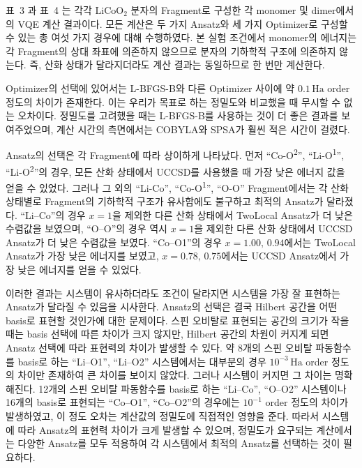 \documentclass[pdflatex,sn-mathphys-num]{sn-jnl}%
\theoremstyle{thmstyleone}%
\theoremstyle{thmstyletwo}%
\theoremstyle{thmstylethree}%
\begin{document}
표~3 과 표~4 는 각각 \(\mathrm{LiCoO_2}\) 분자의 Fragment로 구성한 각 monomer 및 dimer에서의 VQE 계산 결과이다. 모든 계산은 두 가지 Ansatz와 세 가지 Optimizer로 구성할 수 있는 총 여섯 가지 경우에 대해 수행하였다. 본 실험 조건에서 monomer의 에너지는 각 Fragment의 상대 좌표에 의존하지 않으므로 분자의 기하학적 구조에 의존하지 않는다. 즉, 산화 상태가 달라지더라도 계산 결과는 동일하므로 한 번만 계산한다. 

Optimizer의 선택에 있어서는 L-BFGS-B와 다른 Optimizer 사이에 약 \(0.1\,\mathrm{Ha}\) order 정도의 차이가 존재한다. 이는 우리가 목표로 하는 정밀도와 비교했을 때 무시할 수 없는 오차이다. 정밀도를 고려했을 때는 L-BFGS-B를 사용하는 것이 더 좋은 결과를 보여주었으며, 계산 시간의 측면에서는 COBYLA와 SPSA가 훨씬 적은 시간이 걸렸다. 

Ansatz의 선택은 각 Fragment에 따라 상이하게 나타났다. 먼저 “Co-O\textsuperscript{2}”, “Li-O\textsuperscript{1}”, “Li-O\textsuperscript{2}”의 경우, 모든 산화 상태에서 UCCSD를 사용했을 때 가장 낮은 에너지 값을 얻을 수 있었다. 그러나 그 외의 “Li-Co”, “Co-O\textsuperscript{1}”, “O-O” Fragment에서는 각 산화 상태별로 Fragment의 기하학적 구조가 유사함에도 불구하고 최적의 Ansatz가 달라졌다. “Li--Co”의 경우 \(x=1\)을 제외한 다른 산화 상태에서 TwoLocal Ansatz가 더 낮은 수렴값을 보였으며, “O--O”의 경우 역시 \(x=1\)을 제외한 다른 산화 상태에서 UCCSD Ansatz가 더 낮은 수렴값을 보였다. “Co--O1”의 경우 \(x=1.00,\,0.94\)에서는 TwoLocal Ansatz가 가장 낮은 에너지를 보였고, \(x=0.78,\,0.75\)에서는 UCCSD Ansatz에서 가장 낮은 에너지를 얻을 수 있었다.

이러한 결과는 시스템이 유사하더라도 조건이 달라지면 시스템을 가장 잘 표현하는 Ansatz가 달라질 수 있음을 시사한다. Ansatz의 선택은 결국 Hilbert 공간을 어떤 basis로 표현할 것인가에 대한 문제이다. 스핀 오비탈로 표현되는 공간의 크기가 작을 때는 basis 선택에 따른 차이가 크지 않지만, Hilbert 공간의 차원이 커지게 되면 Ansatz 선택에 따라 표현력의 차이가 발생할 수 있다. 약 8개의 스핀 오비탈 파동함수를 basis로 하는 “Li--O1”, “Li--O2” 시스템에서는 대부분의 경우 \(10^{-3}\,\mathrm{Ha}\) order 정도의 차이만 존재하여 큰 차이를 보이지 않았다. 그러나 시스템이 커지면 그 차이는 명확해진다. 12개의 스핀 오비탈 파동함수를 basis로 하는 “Li--Co”, “O--O2” 시스템이나 16개의 basis로 표현되는 “Co--O1”, “Co--O2”의 경우에는 \(10^{-1}\) order 정도의 차이가 발생하였고, 이 정도 오차는 계산값의 정밀도에 직접적인 영향을 준다. 따라서 시스템에 따라 Ansatz의 표현력 차이가 크게 발생할 수 있으며, 정밀도가 요구되는 계산에서는 다양한 Ansatz를 모두 적용하여 각 시스템에서 최적의 Ansatz를 선택하는 것이 필요하다.
\newpage
\end{document}
